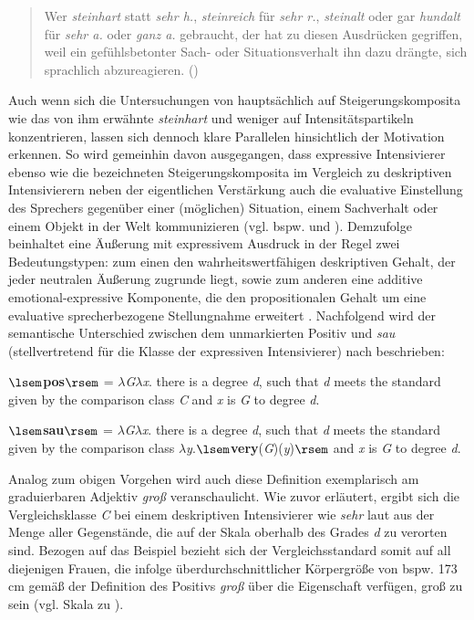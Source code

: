 \begin{quotation} \noindent Wer \textit{steinhart} statt \textit{sehr h.}, \textit{steinreich} für \textit{sehr r.}, \textit{steinalt} oder gar \textit{hundalt} für \textit{sehr a.} oder \textit{ganz a.} gebraucht, der hat zu diesen Ausdrücken gegriffen, weil ein gefühlsbetonter Sach- oder Situationsverhalt ihn dazu drängte, sich sprachlich abzureagieren.
\hfill (\citealt[17f.]{Berz.1953})  \end{quotation}

\noindent Auch wenn sich die Untersuchungen von \citet[]{Berz.1953} hauptsächlich auf Steigerungskomposita wie das von ihm erwähnte \textit{steinhart} und weniger auf Intensitätspartikeln konzentrieren, lassen sich dennoch klare Parallelen hinsichtlich der Motivation erkennen. So wird gemeinhin davon ausgegangen, dass expressive Intensivierer ebenso wie die bezeichneten Steigerungskomposita im Vergleich zu deskriptiven Intensivierern neben der eigentlichen Verstärkung auch die evaluative Einstellung des Sprechers gegenüber einer (möglichen) Situation, einem Sachverhalt oder einem Objekt in der Welt kommunizieren (vgl. bspw. \citealt[315]{Lang.1983} und \citealt[57]{Ortner.2014}). Demzufolge beinhaltet eine Äußerung mit expressivem Ausdruck in der Regel zwei Bedeutungstypen: zum einen den wahrheitswertfähigen deskriptiven Gehalt, der jeder neutralen Äußerung zugrunde liegt, sowie zum anderen eine additive emotional-expressive Komponente, die den propositionalen Gehalt um eine evaluative sprecherbezogene Stellungnahme erweitert {\citep[vgl.][134f.]{Gutzmann.2019a}}. Nachfolgend wird der semantische Unterschied zwischen dem unmarkierten Positiv und \textit{sau} (stellvertretend für die Klasse der expressiven Intensivierer) nach {\citet[133]{Gutzmann.2019a} beschrieben:} \medskip

\noindent
$\lsem$\textbf{pos}$\rsem$ = $\lambda$\textit{G}$\lambda$\textit{x}. there is a degree \textit{d}, such that \textit{d} meets the standard given by the comparison class \textit{C} and \textit{x} is \textit{G} to degree \textit{d}. \medskip

\noindent
$\lsem$\textbf{sau}$\rsem$ = $\lambda$\textit{G}$\lambda$\textit{x}. there is a degree \textit{d}, such that \textit{d} meets the standard given by the comparison class $\lambda$\textit{y}.$\lsem$\textbf{very}(\textit{G})(\textit{y})$\rsem$ and \textit{x} is \textit{G} to degree \textit{d}. 
\medskip

\noindent Analog zum obigen Vorgehen wird auch diese Definition exemplarisch am graduierbaren Adjektiv \textit{groß} veranschaulicht. Wie zuvor erläutert, ergibt sich die Vergleichsklasse \textit{C} bei einem deskriptiven Intensivierer wie \textit{sehr} laut {\citet[133]{Gutzmann.2019a}} aus der Menge aller Gegenstände, die auf der Skala oberhalb des Grades \textit{d} zu verorten sind. Bezogen auf das Beispiel bezieht sich der Vergleichsstandard somit auf all diejenigen Frauen, die infolge überdurchschnittlicher Körpergröße von bspw. 173\,cm gemäß der Definition des Positivs \textit{groß} über die Eigenschaft verfügen, groß zu sein (vgl. Skala zu ).


